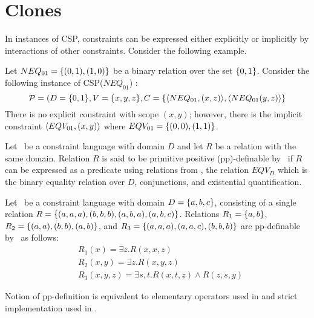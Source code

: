 \section{Clones}
In instances of CSP, constraints can be expressed either explicitly or implicitly by 
interactions of other constraints. Consider the following example.

\begin{example}
Let \(NEQ_{01}=\{{(0,1),(1,0)}\}\) be a binary relation over the set
\(\{{0,1}\}\)\@. Consider the following instance of 
CSP(\(NEQ_{01}\)) :
\[\mathcal{P}=(D=\{{0,1}\},V=\{{x,y,z}\},
 C=\{{\langle NEQ_{01},(x,z) \rangle,\langle NEQ_{01}(y,z) \rangle}\}\]
There is no explicit constraint with scope \((x,y)\)\@; however, there is the implicit 
constraint \(\langle EQV_{01},(x,y) \rangle\) where \(EQV_{01}=\{{(0,0),(1,1)}\}\)\@.
\end{example}

\begin{defi}[pp-definition]
Let \mrelset\ be a constraint language with domain \(D\) and 
let \(R\) be a relation with the same domain.
Relation \(R\) is said to be primitive positive (pp)-definable by \mrelset\
if \(R\) can be expressed as a predicate using relations from \mrelset,
the relation \(EQV_D\) which is the binary equality relation over \(D\),  conjunctions, and
existential quantification.
\end{defi}

\begin{example} \label{example:ppd} 
Let \mrelset\ be a constraint language with domain \(D=\{{a,b,c}\}\), 
consisting of a single relation 
\(R=\{{(a,a,a),(b,b,b),(a,b,a),(a,b,c)}\}\)\@.
Relations 
\(R_1=\{{a,b}\}\), 
\(R_2=\{{(a,a),(b,b),(a,b)}\}\), 
and
\(R_3=\{{(a,a,a),(a,a,c),(b,b,b)}\}\) are pp-definable by \mrelset\ as follows:
\begin{align*}
&R_1(x)=\exists z.R(x,x,z)\\
&R_2(x,y)=\exists z.R(x,y,z)\\
&R_3(x,y,z)=\exists s,t.R(x,t,z)\land R(z,s,y)
\end{align*}
\end{example}

Notion of  pp-definition is equivalent to elementary operators used in \cite{post41,bkkr69,lau}
and strict implementation used in \cite{madu,Trichotomy}\@.

